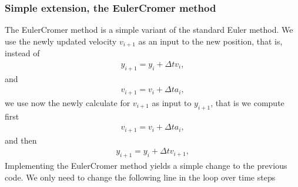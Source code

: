 \documentclass[letterpaper,10pt,english]{sphinxmanual}
\begin{document}
\subsubsection{Simple extension, the Euler\sphinxhyphen{}Cromer method}
\label{\detokenize{chapter2:simple-extension-the-euler-cromer-method}}
The Euler\sphinxhyphen{}Cromer method is a simple variant of the standard Euler
method. We use the newly updated velocity \(v_{i+1}\) as an input to the
new position, that is, instead of
\begin{equation*}
\begin{split}
y_{i+1} = y_i+\Delta t v_i,
\end{split}
\end{equation*}
and
\begin{equation*}
\begin{split}
v_{i+1} = v_i+\Delta t a_i,
\end{split}
\end{equation*}
we use now the newly calculate for \(v_{i+1}\) as input to \(y_{i+1}\), that is
we compute first
\begin{equation*}
\begin{split}
v_{i+1} = v_i+\Delta t a_i,
\end{split}
\end{equation*}
and then
\begin{equation*}
\begin{split}
y_{i+1} = y_i+\Delta t v_{i+1},
\end{split}
\end{equation*}
Implementing the Euler\sphinxhyphen{}Cromer method yields a simple change to the previous code. We only need to change the following line in the loop over time
steps

\begin{sphinxVerbatim}[commandchars=\\\{\}]
   
    \PYG{p}{[}\PYG{p}{]}  \PYG{p}{[}\PYG{p}{]}  \PYG{p}{[}\PYG{p}{]}
    \PYG{p}{[}\PYG{p}{]}  \PYG{p}{[}\PYG{p}{]}  \PYG{p}{[}\PYG{p}{]}
\end{sphinxVerbatim}
\end{document}
